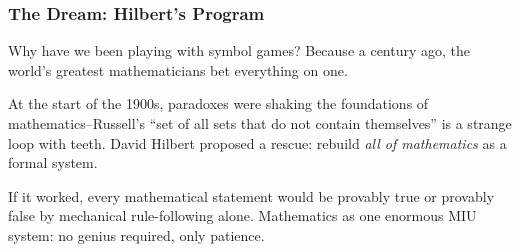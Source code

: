 \documentclass[aspectratio=169]{beamer}
\begin{document}







\begin{frame}[fragile]
  \frametitle{The Dream: Hilbert's Program}

  Why have we been playing with symbol games? Because a century ago,
  the world's greatest mathematicians bet everything on one.

  \pause
  \vspace{\fill}

  At the start of the 1900s, paradoxes were shaking the foundations
  of mathematics--Russell's ``set of all sets that do not contain
  themselves'' is a strange loop with teeth. David Hilbert proposed
  a rescue: rebuild \textit{all of mathematics} as a formal system.

  \pause
  \vspace{\fill}


  \pause
  \vspace{\fill}

  If it worked, every mathematical statement would be provably true
  or provably false by mechanical rule-following alone. Mathematics
  as one enormous MIU system: no genius required, only patience.
\end{frame}
\end{document}
